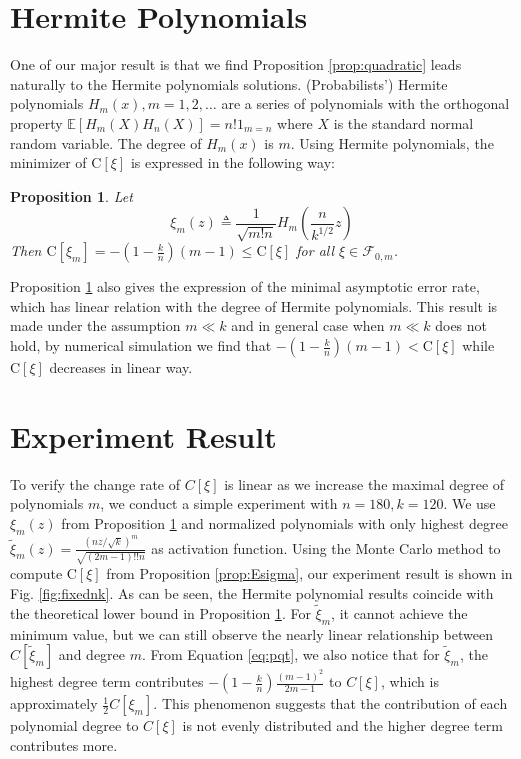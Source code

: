 \documentclass[conference]{IEEEtran}
\newtheorem{proposition}{Proposition}
\def\E{\mathbb{E}}
\begin{document}
\section{Hermite Polynomials}\label{sec:hp}

One of our major result is that we find Proposition \ref{prop:quadratic} leads naturally to the Hermite polynomials solutions.
(Probabilists') Hermite polynomials $H_m(x),m=1,2,\dots$
are a series of polynomials with the orthogonal property $ \E[H_m(X)H_n(X)] = n! \mathrm{1}_{m=n}$ where $X$ is the standard normal random variable.
The degree of $H_m(x)$ is $m$.
Using Hermite polynomials, the minimizer of $\mathrm{C}[\xi]$ is expressed in the following way:
\begin{proposition}\label{prop:value}
Let
\begin{equation}\label{eq:ximopt}
    \xi_m(z) \triangleq \frac{1}{\sqrt{m!n}} H_m(\frac{n}{k^{1/2}} z)
\end{equation}
Then $\mathrm{C}[\xi_m] = -(1-\frac{k}{n})(m-1) \leq \mathrm{C}[\xi] $ for all $\xi \in \mathcal{F}_{0,m}$.
\end{proposition}
Proposition \ref{prop:value} also gives the expression of the minimal asymptotic error rate, which has linear relation with the degree of Hermite polynomials. This result is made under the assumption $ m \ll k$ and in general case when $ m \ll k$ does not hold, by numerical simulation we find that $-(1-\frac{k}{n})(m-1) < \mathrm{C}[\xi]$ while $\mathrm{C}[\xi]$ decreases in linear way.

\section{Experiment Result}\label{sec:er}

To verify the change rate of $C[\xi]$ is linear as we increase the maximal degree of polynomials $m$,
we conduct a simple experiment with $n=180, k=120$. We use $\xi_m(z)$ from Proposition
\ref{prop:value} and normalized polynomials with only highest degree $\tilde{\xi}_m(z) = \frac{(nz/\sqrt{k})^m}{\sqrt{(2m-1)!!n}}$ as activation function. Using the Monte Carlo method to compute $\mathrm{C}[\xi]$ from Proposition \ref{prop:Esigma},
our experiment result is shown in Fig. \ref{fig:fixednk}.
As can be seen, the Hermite polynomial results coincide with the theoretical lower bound in Proposition \ref{prop:value}.
For $\tilde{\xi}_m$, it cannot achieve the minimum value,
but we can still observe the nearly linear relationship between $C[\tilde{\xi}_m]$ and degree $m$.
From Equation \eqref{eq:pqt}, we also notice that for $\tilde{\xi}_m$,
the highest degree term contributes $-(1-\frac{k}{n})\frac{(m-1)^2}{2m-1}$ to $C[\xi]$,
which is approximately $\frac{1}{2} C[\xi_m]$.
This phenomenon suggests that the contribution of each polynomial
degree to $C[\xi]$ is not evenly distributed and
the higher degree term contributes more.  
\end{document}
